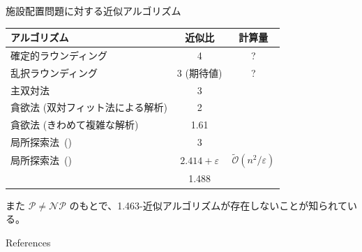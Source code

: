 \documentclass[aspectratio=169]{beamer}
\begin{document}
\begin{frame}{施設配置問題に対する近似アルゴリズム}
  \begin{table}[]
    \centering
    \begin{tabular}{lcc}
      \toprule
      アルゴリズム                              & 近似比                     & 計算量                                      \\
      \midrule
      確定的ラウンディング                          & 4                       & ?                                        \\
      乱択ラウンディング                           & 3 (期待値)                 & ?                                        \\
      主双対法                                & 3                       &                                          \\
      貪欲法 (双対フィット法による解析)                  & 2                       &                                          \\
      貪欲法 (きわめて複雑な解析)                     & 1.61                    &                                          \\
      局所探索法~(\cite{arya2004local})        & 3                       &                                          \\
      局所探索法~(\cite{charikar2005improved}) & \(2.414 + \varepsilon\) & \(\tilde{\mathcal{O}}(n^2/\varepsilon)\) \\
      \cite{li2013a}                      & 1.488                   &                                          \\
      \bottomrule
    \end{tabular}
  \end{table}

  また \(\mathcal{P} \neq \mathcal{NP}\) のもとで、1.463-近似アルゴリズムが存在しないことが知られている。
\end{frame}

\begin{frame}[allowframebreaks]{References}
  \printbibliography[heading=none]{}
\end{frame}
\end{document}
